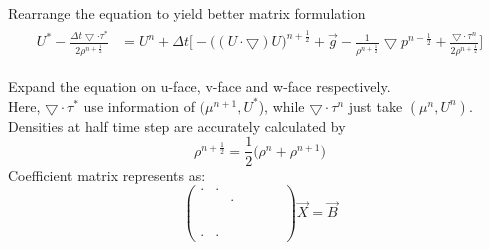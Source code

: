 \documentclass{article}
\numberwithin{equation}{subsection}
\newcommand{\dottedcolumn}[3]{%
  \settowidth{\dimen0}{$#1$}
  \settowidth{\dimen2}{$#2$}
  \ifdim\dimen2>\dimen0 \dimen0=\dimen2 \fi
  \begin{pmatrix}\,
    \vcenter{
      \kern.6ex
      \vbox to \dimexpr#1\normalbaselineskip-1.2ex{
        \hbox{$#2$}
    \kern3pt
    \xleaders\vbox{\hbox to \dimen0{\hss.\hss}\vskip4pt}\vfill
    \kern1pt
    \hbox{$#3$}
  }\kern.6ex}\,
  \end{pmatrix}
}
\begin{document}
Rearrange the equation to yield better matrix formulation
\begin{align}
\begin{split}
U^{*} - \frac{\Delta t \bigtriangledown \cdot \tau^{*}}{2\rho^{n+\frac{1}{2}}} &= U^n + \Delta t \Bigg[ -\Big( (U \cdot \bigtriangledown) U\Big)^{n+\frac{1}{2}} + \vec{g} 
-\frac{1}{\rho^{n+\frac{1}{2}}} \bigtriangledown p^{n-\frac{1}{2}} + \frac{\bigtriangledown \cdot \tau^{n}}{2\rho^{n+\frac{1}{2}}} \Bigg]
\end{split}
\end{align}


Expand the equation on u-face, v-face and w-face respectively.\\
Here, $\bigtriangledown \cdot \tau^*$ use information of $(\mu^{n+1}, U^*$), while $\bigtriangledown\cdot \tau^n$ just take $(\mu^n, U^n)$.
Densities at half time step are accurately calculated by 
\begin{equation}
\rho^{n + \frac{1}{2}} = \frac{1}{2} \Big( \rho^n + \rho^{n+1}\Big)
\end{equation}
Coefficient matrix represents as:
\begin{equation}
  \begin{pmatrix}
    \cdot & \cdot &     &     &   &  &\\
    	&  & \cdot &     &   &  &\\
        &  &  &  &   &  &\\
        &     &  & & &  &\\
        &     &   &  &  &  & \\
        &     &   &  &     &  & \\
    \cdot & \cdot &     &     &     & &
  \end{pmatrix}
  \vec{X} = \vec{B}
\end{equation}
\end{document}
